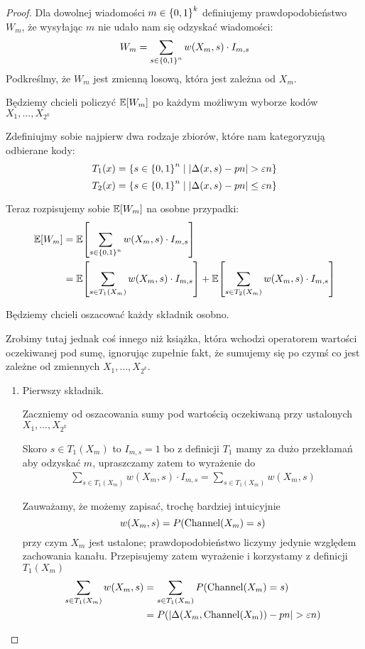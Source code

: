 \begin{proof}
	Dla dowolnej wiadomości \( m \in \set{0, 1}^k \) definiujemy prawdopodobieństwo \( W_m \), że wysyłając \( m \) nie udało nam się odzyskać wiadomości:
	\[
		W_m = \sum_{s \in \set{0,1}^n} w(X_m, s) \cdot I_{m, s}
	\]
	Podkreślmy, że \( W_m \) jest zmienną losową, która jest zależna od \( X_m \).

	Będziemy chcieli policzyć \( \expected{W_m} \) po każdym możliwym wyborze kodów \( X_1, \dots, X_{2^k} \)

	Zdefiniujmy sobie najpierw dwa rodzaje zbiorów, które nam kategoryzują odbierane kody:
	\[
		T_1(x) = \set{s \in \set{0,1}^n \mid \abs{\Delta(x, s) - pn} > \varepsilon n}
	\]
	\[
		T_2(x) = \set{s \in \set{0,1}^n \mid \abs{\Delta(x, s) - pn} \leq \varepsilon n}
	\]

	Teraz rozpisujemy sobie \( \expected{W_m} \) na osobne przypadki:
	\begin{align*}
		\expected{W_m}
		 & = \expected{\sum_{s \in \set{0, 1}^n} w(X_m, s) \cdot I_{m, s}} \\
		 & = \expected{\sum_{s \in T_1(X_m)} w(X_m, s) \cdot I_{m, s}}
		+ \expected{\sum_{s \in T_2(X_m)} w(X_m, s) \cdot I_{m, s}}
	\end{align*}

	Będziemy chcieli oszacować każdy składnik osobno.

	Zrobimy tutaj jednak coś innego niż książka, która wchodzi operatorem wartości oczekiwanej pod sumę, ignorując zupełnie fakt, że sumujemy się po czymś co jest zależne od zmiennych \( X_1, \dots, X_{2^k} \).

	\begin{enumerate}
		\item Pierwszy składnik.

		      Zaczniemy od oszacowania sumy pod wartością oczekiwaną przy ustalonych \( X_1, \dots, X_{2^k} \)

		      Skoro \( s \in T_1(X_m) \) to \( I_{m, s} = 1 \) bo z definicji \( T_1 \) mamy za dużo przekłamań aby odzyskać \( m \), upraszczamy zatem to wyrażenie do
		      \begin{align*}
			      \sum_{s \in T_1(X_m)} w(X_m, s) \cdot I_{m, s} = \sum_{s \in T_1(X_m)} w(X_m, s)
		      \end{align*}

		      Zauważamy, że możemy zapisać, trochę bardziej intuicyjnie
		      \[
			      w(X_m, s) = P(\operatorname{Channel}(X_m) = s)
		      \]
		      przy czym \( X_m \) jest ustalone; prawdopodobieństwo liczymy jedynie względem zachowania kanału.
		      Przepisujemy zatem wyrażenie i korzystamy z definicji \( T_1(X_m) \)
		      \begin{align*}
			      \sum_{s \in T_1(X_m)} w(X_m, s)
			       & = \sum_{s \in T_1(X_m)} P(\operatorname{Channel}(X_m) = s)               \\
			       & = P(\left\lvert\Delta(X_m, \operatorname{Channel}(X_m)) - pn\right\rvert > \varepsilon n)
		      \end{align*}


\end{enumerate}
\end{proof}
